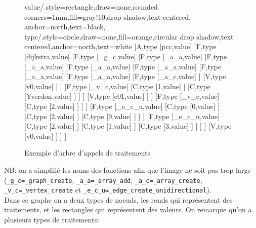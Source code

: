 \documentclass[french]{article}
\begin{document}
			\begin{figure}[H]
				\centering
				\begin{forest}
				value/.style={rectangle,draw=none,rounded corners=1mm,fill=gray!10,drop shadow,text centered, anchor=north,text=black}, 
				type/.style={circle,draw=none,fill=orange,circular drop shadow,text centered,anchor=north,text=white}
					[{A},type
						[{pcc},value] 
						[{F},type
							[{dijkstra},value]
							[{F},type
								[{\_g\_c},value]
								[{F},type
									[{\_a\_a},value]
									[{F},type
										[{\_a\_a},value]
										[{F},type
											[{\_a\_a},value]
											[{F},type
												[{\_a\_a},value]
												[{F},type
													[{\_a\_a},value]
													[{F},type
														[{\_a\_a},value]
														[{F},type
															[{\_a\_c},value]
														]
														[{V},type
															[{v0},value]
														]
													]
													[{F},type
														[{\_v\_c},value]
														[{C},type
															[{1},value]
														]
														[{C},type
															[{Yverdon},value]
														]
													]
												]
												[{V},type
													[{e01},value]
												]
											]
											[{F},type
												[{\_v\_c},value]
												[{C},type
													[{2},value]
												]
											]
										]
										[{F},type
											[{\_e\_c\_u},value]
											[{C},type
												[{0},value]
											]
											[{C},type
												[{2},value]
											]
											[{C},type
												[{9},value]
											]
										]
									]
									[{F},type
										[{\_e\_c\_u},value]
										[{C},type
											[{2},value]
										]
										[{C},type
											[{1},value]
										]
										[{C},type
											[{3},value]
										]
									]
								]
							]
							[{V},type
								[{v0},value]
							]
						]
					]	
				\end{forest}
				\caption{Exemple d'arbre d'appels de traitements}
			\end{figure}
			
			NB: on a simplifié les noms des fonctions afin que l'image ne soit pas trop large (\texttt{\_g\_c=\_graph\_create}, \texttt{\_a\_a=\_array\_add}, \texttt{\_a\_c=\_array\_create}, \texttt{\_v\_c=\_vertex\_create} et \texttt{\_e\_c\_u=\_edge\_create\_unidirectional}).\\
			
			Dans ce graphe on a deux types de noeuds, les ronds qui représentent des traitements, et les rectangles qui représentent des valeurs. On remarque qu'on a plusieurs types de traitements:
			
\end{document}
